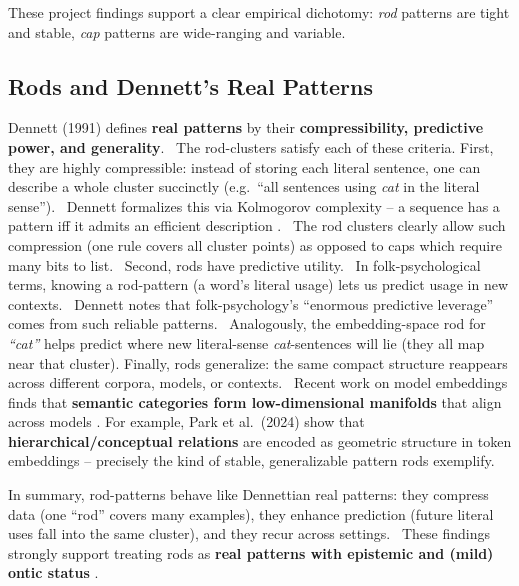 \documentclass[12pt]{article}
\begin{document}
These project findings support a clear empirical dichotomy: \emph{rod} patterns are tight and stable, \emph{cap} patterns are wide-ranging and variable.

\subsection{Rods and Dennett's Real Patterns}\label{rods-and-dennetts-real-patterns}

Dennett (1991) defines \textbf{real patterns} by their \textbf{compressibility, predictive power, and generality}.~ The rod-clusters satisfy each of these criteria. First, they are highly compressible: instead of storing each literal sentence, one can describe a whole cluster succinctly (e.g.~``all sentences using \emph{cat} in the literal sense'').~ Dennett formalizes this via Kolmogorov complexity -- a sequence has a pattern iff it admits an efficient description .~ The rod clusters clearly allow such compression (one rule covers all cluster points) as opposed to caps which require many bits to list.~ Second, rods have predictive utility.~ In folk-psychological terms, knowing a rod-pattern (a word's literal usage) lets us predict usage in new contexts.~ Dennett notes that folk-psychology's ``enormous predictive leverage'' comes from such reliable patterns.~ Analogously, the embedding-space rod for \emph{``cat''} helps predict where new literal-sense \emph{cat}-sentences will lie (they all map near that cluster). Finally, rods generalize: the same compact structure reappears across different corpora, models, or contexts.~ Recent work on model embeddings finds that \textbf{semantic categories form low-dimensional manifolds} that align across models . For example, Park et al.~(2024) show that \textbf{hierarchical/conceptual relations} are encoded as geometric structure in token embeddings -- precisely the kind of stable, generalizable pattern rods exemplify.

In summary, rod-patterns behave like Dennettian real patterns: they compress data (one ``rod'' covers many examples), they enhance prediction (future literal uses fall into the same cluster), and they recur across settings.~ These findings strongly support treating rods as \textbf{real patterns with epistemic and (mild) ontic status} .
\end{document}
